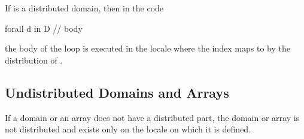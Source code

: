 \begin{example}
If  is a distributed domain, then in the code
\begin{chapel}
forall d in D {
  // body
}
\end{chapel}
the body of the loop is executed in the locale where the
index  maps to by the distribution of .
\end{example}

\subsection{Undistributed Domains and Arrays}
\label{Undistributed_Domains_and_Arrays}

If a domain or an array does not have a distributed part, the domain
or array is not distributed and exists only on the locale on which it
is defined.
